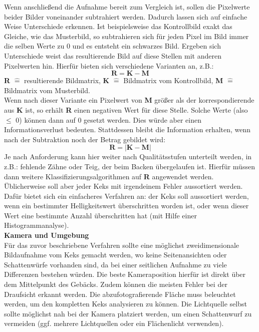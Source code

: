 \documentclass{ezb}
\begin{document}
\newline
Wenn anschließend die Aufnahme bereit zum Vergleich ist, sollen die Pixelwerte beider Bilder voneinander subtrahiert werden. Dadurch lassen sich auf einfache Weise Unterschiede erkennen. Ist beispielsweise das Kontrollbild exakt das Gleiche, wie das Musterbild, so subtrahieren sich für jeden Pixel im Bild immer die selben Werte zu 0 und es entsteht ein schwarzes Bild. Ergeben sich Unterschiede weist das resultierende Bild auf diese Stellen mit anderen Pixelwerten hin. Hierfür bieten sich  verschiedene Varianten an, z.B.:
\begin{equation}
\textbf{R} = \textbf{K} - \textbf{M}
\end{equation}
\textbf{R} $\widehat{=}$ resultierende Bildmatrix, \textbf{K} $\widehat{=}$ Bildmatrix vom Kontrollbild, \textbf{M} $\widehat{=}$ Bildmatrix vom Musterbild. \\
\newline
Wenn nach dieser Variante ein Pixelwert von \textbf{M} größer als der korrespondierende aus \textbf{K} ist, so erhält \textbf{R} einen negativen Wert für diese Stelle. Solche Werte (also $\leq$ 0) können dann auf 0 gesetzt werden. Dies würde aber einen Informationsverlust bedeuten. Stattdessen bleibt die Information erhalten, wenn nach der Subtraktion noch der Betrag gebildet wird:
\begin{equation}
\textbf{R} = \vert \textbf{K} - \textbf{M} \vert 
\end{equation}
Je nach Anforderung kann hier weiter nach Qualitätsstufen unterteilt werden, in z.B.: fehlende Zähne oder Teig, der beim Backen übergelaufen ist. Hierfür müssen dann weitere Klassifizierungsalgorithmen auf \textbf{R} angewendet werden. Üblicherweise soll aber jeder Keks mit irgendeinem Fehler aussortiert werden. Dafür bietet sich ein einfacheres Verfahren an: der Keks soll aussortiert werden, wenn ein bestimmter Helligkeitswert überschritten worden ist, oder wenn dieser Wert eine bestimmte Anzahl überschritten hat (mit Hilfe einer Histogrammanalyse).\\ \newline
\textbf{{\large Kamera und Umgebung}}\\
\newline
Für das zuvor beschriebene Verfahren sollte eine möglichst zweidimensionale Bildaufnahme vom Keks gemacht werden, wo keine Seitenansichten oder Schattenwürfe vorhanden sind, da bei einer seitlichen Aufnahme zu viele Differenzen bestehen würden. Die beste Kameraposition hierfür ist direkt über dem Mittelpunkt des Gebäcks. Zudem können die meisten Fehler bei der Draufsicht erkannt werden. Die abzufotografierende Fläche muss beleuchtet werden, um den kompletten Keks analysieren zu können. Die Lichtquelle selbst sollte möglichst nah bei der Kamera platziert werden, um einen Schattenwurf zu vermeiden (ggf. mehrere Lichtquellen oder ein Flächenlicht verwenden). \\ 
\end{document}
